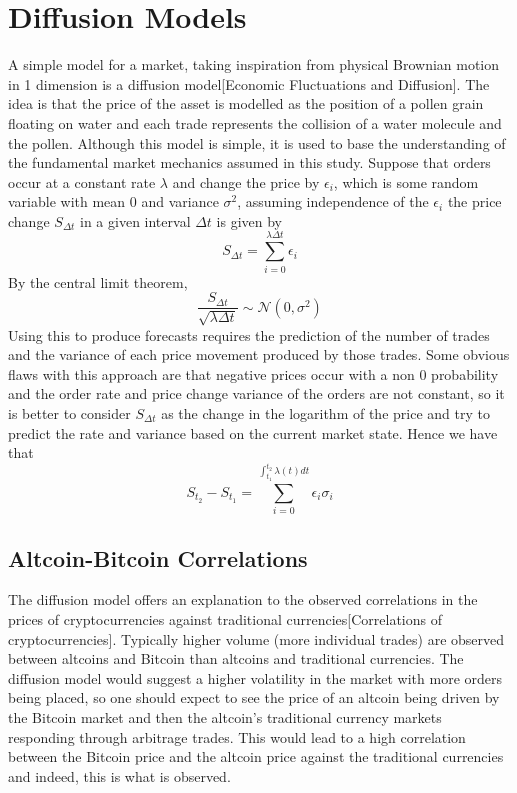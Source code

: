 \documentclass[a4paper,10pt]{article}
\begin{document}
\section{Diffusion Models}
A simple model for a market, taking inspiration from physical Brownian motion in 1 dimension is a diffusion model[Economic Fluctuations and Diffusion]. The idea is that the price of the asset is modelled as the position of a pollen grain floating on water and each trade represents the collision of a water molecule and the pollen. Although this model is simple, it is used to base the understanding of the fundamental market mechanics assumed in this study. Suppose that orders occur at a constant rate $\lambda$ and change the price by $\epsilon_i$, which is some random variable with mean 0 and variance $\sigma^2$, assuming independence of the $\epsilon_i$ the price change $S_{\Delta t}$ in a given interval $\Delta t$ is given by
\begin{equation}
S_{\Delta t} = \sum_{i = 0}^{\lambda \Delta t}\epsilon_i
\end{equation}
By the central limit theorem, 
\begin{equation}
\frac{S_{\Delta t}}{\sqrt{\lambda \Delta t}} \sim \mathcal{N}(0, \sigma^{2})
\end{equation}
Using this to produce forecasts requires the prediction of the number of trades and the variance of each price movement produced by those trades. Some obvious flaws with this approach are that negative prices occur with a non 0 probability and the order rate and price change variance of the orders are not constant, so it is better to consider $S_{\Delta t}$ as the change in the logarithm of the price and try to predict the rate and variance based on the current market state. Hence we have that
\begin{equation}
S_{t_2} - S_{t_1} = \sum_{i = 0}^{\int_{t_1}^{t_2}\lambda(t)dt}\epsilon_i\sigma_i
\end{equation}
\subsection{Altcoin-Bitcoin Correlations}
The diffusion model offers an explanation to the observed correlations in the prices of cryptocurrencies against traditional currencies[Correlations of cryptocurrencies]. Typically higher volume (more individual trades) are observed between altcoins and Bitcoin than altcoins and traditional currencies. The diffusion model would suggest a higher volatility in the market with more orders being placed, so one should expect to see the price of an altcoin being driven by the Bitcoin market and then the altcoin's traditional currency markets responding through arbitrage trades. This would lead to a high correlation between the Bitcoin price and the altcoin price against the traditional currencies and indeed, this is what is observed.
\end{document}
